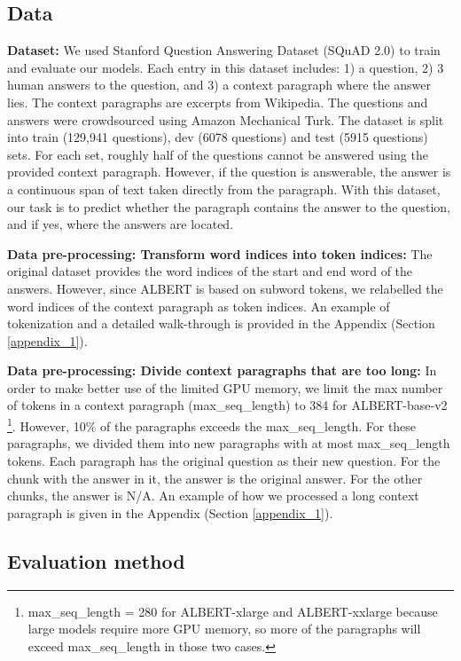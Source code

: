 \documentclass{article}
\begin{document}
\subsection{Data}
\textbf{Dataset:} We used Stanford Question Answering Dataset (SQuAD 2.0) \citep{dataset} to train and evaluate our models. Each entry in this dataset includes: 1) a question, 2) 3 human answers to the question, and 3) a context paragraph where the answer lies. The context paragraphs are excerpts from Wikipedia. The questions and answers were crowdsourced using Amazon Mechanical Turk. The dataset is split into train (129,941 questions), dev (6078 questions) and test (5915 questions) sets. For each set, roughly half of the questions cannot be answered using the provided context paragraph. However, if the question is answerable, the answer is a continuous span of text taken directly from the paragraph. With this dataset, our task is to predict whether the paragraph contains the answer to the question, and if yes, where the answers are located. 

\textbf{Data pre-processing: Transform word indices into token indices:} The original dataset provides the word indices of the start and end word of the answers. However, since ALBERT is based on subword tokens, we relabelled the word indices of the context paragraph as token indices. An example of tokenization and a detailed walk-through is provided in the Appendix (Section \ref{appendix_1}).

\textbf{Data pre-processing: Divide context paragraphs that are too long:} In order to make better use of the limited GPU memory, we limit the max number of tokens in a context paragraph (max\_seq\_length) to 384 for ALBERT-base-v2 \footnote{max\_seq\_length = 280 for ALBERT-xlarge and ALBERT-xxlarge because large models require more GPU memory, so more of the paragraphs will exceed max\_seq\_length in those two cases.}. However, 10\% of the paragraphs exceeds the max\_seq\_length. For these paragraphs, we divided them into new paragraphs with at most max\_seq\_length tokens. Each paragraph has the original question as their new question. For the chunk with the answer in it, the answer is the original answer. For the other chunks, the answer is N/A. An example of how we processed a long context paragraph is given in the Appendix (Section \ref{appendix_1}).





\subsection{Evaluation method} \label{evaluation_method}
\end{document}
